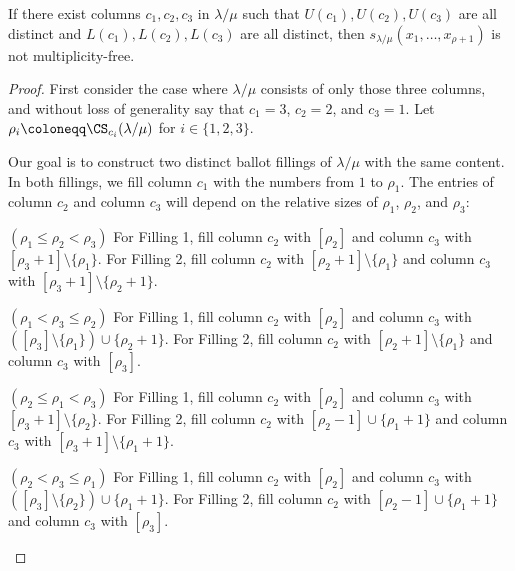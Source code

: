 \begin{prop}
\label{prop:3col}
If there exist columns $c_1,c_2,c_3$ in $\lambda/\mu$ such that $U(c_1),U(c_2),U(c_3)$ are all distinct and $L(c_1),L(c_2),L(c_3)$ are all distinct, then $s_{\lambda/\mu}(x_1,\ldots,x_{\rho+1})$ is not multiplicity-free.
\end{prop}
\begin{proof}


First consider the case where $\lambda/\mu$ consists of only those three columns, and without loss of generality say that $c_1=3$, $c_2=2$, and $c_3=1$. Let $\rho_i \coloneqq \CS _{c_i}(\lambda/\mu)$ for $i \in \{1,2,3\}$.

Our goal is to construct two distinct ballot fillings of $\lambda/\mu$ with the same content. In both fillings, we fill column $c_1$ with the numbers from $1$ to $\rho_1$. The entries of column $c_2$ and column $c_3$ will depend on the relative sizes of $\rho_1$, $\rho_2$, and $\rho_3$:


\begin{Case}
{ $(\rho_1\leq \rho_2 < \rho_3)$} 
For Filling 1, fill column $c_2$ with $[\rho_2]$ and column $c_3$ with $[\rho_3+1]\setminus \{\rho_1\}$. For Filling 2, fill column $c_2$ with $[\rho_2+1]\setminus \{\rho_1\}$ and column $c_3$ with $[\rho_3+1]\setminus \{\rho_2+1\}$.
\end{Case}

\begin{Case}
{ $(\rho_1< \rho_3 \leq \rho_2)$} 
For Filling 1, fill column $c_2$ with $[\rho_2]$ and column $c_3$ with $([\rho_3]\setminus \{\rho_1\})\cup \{\rho_2+1\}$. For Filling 2, fill column $c_2$ with $[\rho_2+1]\setminus \{\rho_1\}$ and column $c_3$ with $[ \rho_3]$.
\end{Case}

\begin{Case}
{ $(\rho_2\leq \rho_1 < \rho_3)$} 
For Filling 1, fill column $c_2$ with $[\rho_2]$ and column $c_3$ with $[\rho_3+1]\setminus \{\rho_2\}$. For Filling 2, fill column $c_2$ with $[\rho_2-1]\cup\{\rho_1+1\}$ and column $c_3$ with $[\rho_3+1]\setminus\{\rho_1+1\}$.
\end{Case}

\begin{Case}
{ $(\rho_2< \rho_3 \leq \rho_1)$} For Filling 1, fill column $c_2$ with $[\rho_2]$ and column $c_3$ with $([\rho_3]\setminus \{\rho_2\})\cup \{\rho_1+1\}$. For Filling 2, fill column $c_2$ with $[\rho_2-1]\cup\{\rho_1+1\}$ and column $c_3$ with $[\rho_3]$.
\end{Case}


\end{proof}
